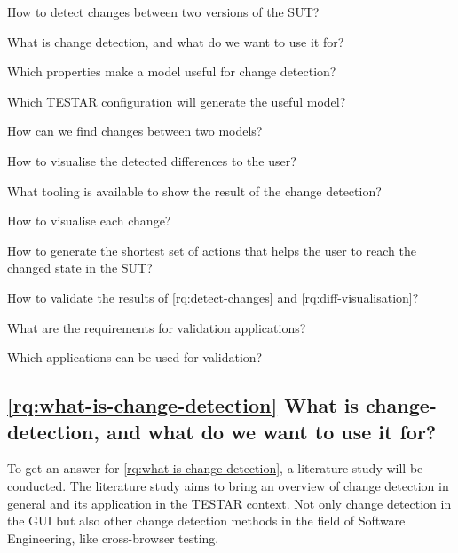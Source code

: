 \begin{questions}
    \item How to detect changes between two versions of the SUT? \label{rq:detect-changes}
    \begin{questions}
        \item What is change detection, and what do we want to use it for? \label{rq:what-is-change-detection}
        \item Which properties make a model useful for change detection? \label{rq:useful-detection}
        \item Which TESTAR configuration will generate the useful model? \label{rq:TESTAR-config}
        \item How can we find changes between two models? \label{rq:finding-changes}
    \end{questions}

    \item How to visualise the detected differences to the user? \label{rq:diff-visualisation}
    \begin{questions}
        \item What tooling is available to show the result of the change detection? \label{rq:tooling}
        \item How to visualise each change? \label{rq:type-visualisation}
        \item How to generate the shortest set of actions that helps the user to reach the changed state in the SUT? \label{rq:shortest-set}    
    \end{questions}
    
    \item How to validate the results of \ref{rq:detect-changes} and \ref{rq:diff-visualisation}? \label{rq:validation}
    \begin{questions}
        \item What are the requirements for validation applications? \label{rq:req-apps}
        \item Which applications can be used for validation? \label{rq:validation-apps}
    \end{questions}
\end{questions}

\subsection{\ref{rq:what-is-change-detection} What is change-detection, and what do we want to use it for?}
To get an answer for \ref{rq:what-is-change-detection}, a literature study will be conducted. The literature study aims to bring an overview of change detection in general and its application in the TESTAR context. Not only change detection in the GUI but also other change detection methods in the field of Software Engineering, like cross-browser testing. 

